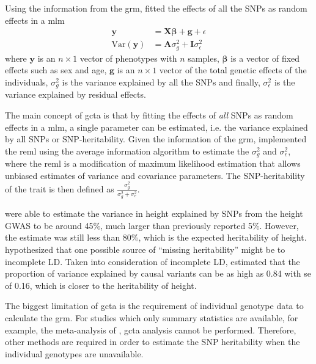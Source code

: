 	Using the information from the \gls{grm}, \citet{Yang2011} fitted the effects of all the \glspl{SNP} as random effects in a \gls{mlm}
	\begin{align}
	\boldsymbol{y} &= \boldsymbol{X\beta}+\boldsymbol{g}+\epsilon\\
	\mathrm{Var}(\boldsymbol{y}) &= \boldsymbol{A}\sigma_g^2+\boldsymbol{I}\sigma_\epsilon^2
	\end{align}
	where $\boldsymbol{y}$ is an $n\times 1$ vector of phenotypes with $n$ samples, $\boldsymbol{\beta}$ is a vector of fixed effects such as sex and age, $\boldsymbol{g}$ is an $n\times 1$ vector of the total genetic effects of the individuals, $\sigma_g^2$ is the variance explained by all the \glspl{SNP} and finally, $\sigma_\epsilon^2$ is the variance explained by residual effects.

	The main concept of \gls{gcta} is that by fitting the effects of \emph{all} \glspl{SNP} as random effects in a \gls{mlm}, a single parameter can be estimated, i.e. the variance explained by all \glspl{SNP} or \gls{SNP}-heritability.
	Given the information of the \gls{grm}, \citet{Yang2011} implemented the \gls{reml} using the average information algorithm to estimate the $\sigma_g^2$ and $\sigma_\epsilon^2$, where the \gls{reml} is a modification of maximum likelihood estimation that allows unbiased estimates of variance and covariance parameters.
	The \gls{SNP}-heritability of the trait is then defined as $\frac{\sigma_g^2}{\sigma_g^2+\sigma_e^2}$.

	\citet{Yang2010a} were able to estimate the variance in height explained by \glspl{SNP} from the height \gls{GWAS} to be around 45\%, much larger than previously reported 5\%.
	However, the estimate was still less than 80\%, which is the expected heritability of height.
	\citet{Yang2010a} hypothesized that one possible source of ``missing heritability'' might be to incomplete \gls{LD}.
	Taken into consideration of incomplete \gls{LD}, \citet{Yang2010a} estimated that the proportion of variance explained by causal variants can be as high as 0.84 with \gls{se} of 0.16, which is closer to the heritability of height.
	
	The biggest limitation of \gls{gcta} is the requirement of individual genotype data to calculate the \gls{grm}.
	For studies which only summary statistics are available, for example, the meta-analysis of , \gls{gcta} analysis cannot be performed.
	Therefore, other methods are required in order to estimate the \gls{SNP} heritability when the individual genotypes are unavailable. 
	
